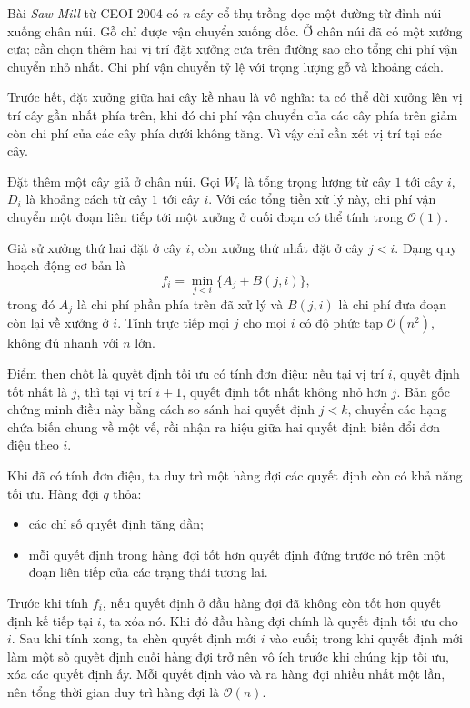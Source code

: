 \documentclass[11pt]{article}
\newcommand{\Oh}{\mathcal{O}}
\begin{document}
Bài \textit{Saw Mill} từ CEOI 2004 có \(n\) cây cổ thụ trồng dọc một đường từ
đỉnh núi xuống chân núi. Gỗ chỉ được vận chuyển xuống dốc. Ở chân núi đã có
một xưởng cưa; cần chọn thêm hai vị trí đặt xưởng cưa trên đường sao cho tổng
chi phí vận chuyển nhỏ nhất. Chi phí vận chuyển tỷ lệ với trọng lượng gỗ và
khoảng cách.

Trước hết, đặt xưởng giữa hai cây kề nhau là vô nghĩa: ta có thể dời xưởng
lên vị trí cây gần nhất phía trên, khi đó chi phí vận chuyển của các cây phía
trên giảm còn chi phí của các cây phía dưới không tăng. Vì vậy chỉ cần xét
vị trí tại các cây.

Đặt thêm một cây giả ở chân núi. Gọi \(W_i\) là tổng trọng lượng từ cây \(1\)
tới cây \(i\), \(D_i\) là khoảng cách từ cây \(1\) tới cây \(i\). Với các tổng
tiền xử lý này, chi phí vận chuyển một đoạn liên tiếp tới một xưởng ở cuối
đoạn có thể tính trong \(\Oh(1)\).

Giả sử xưởng thứ hai đặt ở cây \(i\), còn xưởng thứ nhất đặt ở cây \(j<i\).
Dạng quy hoạch động cơ bản là
\[
  f_i=\min_{j<i}\{A_j+B(j,i)\},
\]
trong đó \(A_j\) là chi phí phần phía trên đã xử lý và \(B(j,i)\) là chi phí
đưa đoạn còn lại về xưởng ở \(i\). Tính trực tiếp mọi \(j\) cho mọi \(i\) có
độ phức tạp \(\Oh(n^2)\), không đủ nhanh với \(n\) lớn.

Điểm then chốt là quyết định tối ưu có tính đơn điệu: nếu tại vị trí \(i\),
quyết định tốt nhất là \(j\), thì tại vị trí \(i+1\), quyết định tốt nhất
không nhỏ hơn \(j\). Bản gốc chứng minh điều này bằng cách so sánh hai quyết
định \(j<k\), chuyển các hạng chứa biến chung về một vế, rồi nhận ra hiệu
giữa hai quyết định biến đổi đơn điệu theo \(i\).

Khi đã có tính đơn điệu, ta duy trì một hàng đợi các quyết định còn có khả
năng tối ưu. Hàng đợi \(q\) thỏa:
\begin{itemize}
  \item các chỉ số quyết định tăng dần;
  \item mỗi quyết định trong hàng đợi tốt hơn quyết định đứng trước nó trên
  một đoạn liên tiếp của các trạng thái tương lai.
\end{itemize}

Trước khi tính \(f_i\), nếu quyết định ở đầu hàng đợi đã không còn tốt hơn
quyết định kế tiếp tại \(i\), ta xóa nó. Khi đó đầu hàng đợi chính là quyết
định tối ưu cho \(i\). Sau khi tính xong, ta chèn quyết định mới \(i\) vào
cuối; trong khi quyết định mới làm một số quyết định cuối hàng đợi trở nên vô
ích trước khi chúng kịp tối ưu, xóa các quyết định ấy. Mỗi quyết định vào và
ra hàng đợi nhiều nhất một lần, nên tổng thời gian duy trì hàng đợi là
\(\Oh(n)\).
\end{document}

